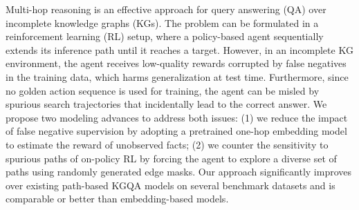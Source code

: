 Multi-hop reasoning is an effective approach for query answering (QA) over incomplete knowledge graphs (KGs). The problem can be formulated in a reinforcement learning (RL) setup, where a policy-based agent sequentially extends its inference path until it reaches a target. However, in an incomplete KG environment, the agent receives low-quality rewards corrupted by false negatives in the training data, which harms generalization at test time. Furthermore, since no golden action sequence is used for training, the agent can be misled by spurious search trajectories that incidentally lead to the correct answer. We propose two modeling advances to address both issues: (1) we reduce the impact of false negative supervision by adopting a pretrained one-hop embedding model to estimate the reward of unobserved facts; (2) we counter the sensitivity to spurious paths of on-policy RL by forcing the agent to explore a diverse set of paths using randomly generated edge masks. Our approach significantly improves over existing path-based KGQA models on several benchmark datasets and is comparable or better than embedding-based models.

